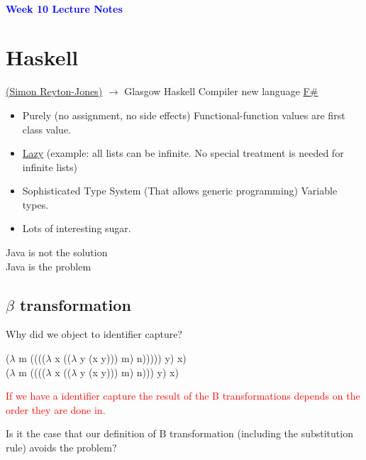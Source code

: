 \documentclass{article}
\begin{document}
\begin{flushleft}
\noindent\makebox[\linewidth]{\rule{\paperwidth}{0.4pt}}\\
\vspace*{1.5cm}
\textcolor{blue}{\textbf{{\huge Week 10 Lecture Notes}}}
\section*{Haskell}
\begin{flushleft}
\underline{(Simon Reyton-Jones)} $\rightarrow$ Glasgow Haskell Compiler new language \underline{F\#}
\begin{itemize}
\item Purely (no assignment, no side effects) Functional-function values are first class value.
\item \underline{Lazy} (example: all lists can be infinite. No special treatment is needed for infinite lists)
\item Sophisticated Type System (That allows generic programming) Variable types.
\item Lots of interesting sugar.
\end{itemize}
\begin{flushleft}
\begin{tcolorbox}
Java is not the solution\\
Java is the problem
\end{tcolorbox}
\bigskip
\end{flushleft}
	
\subsection*{$\beta$ transformation}
\begin{flushleft}
Why did we object to identifier capture?\\
\begin{flushleft}
\doublespacing 
($\lambda$ m (((($\lambda$ x (($\lambda$ y (x y))) m) n))))) y) x)\\ ($\lambda$ m (((($\lambda$ x (($\lambda$ y (x y))) m) n))) y) x)
\end{flushleft}
\textcolor{red}{If we have a identifier capture the result of the B transformations depends on the order they are done in.}
\end{flushleft}
\begin{flushleft}
Is it the case that our definition of B transformation (including the substitution rule) avoids the problem?\\
\bigskip
\end{flushleft}


\end{flushleft}
\end{flushleft}
\end{document}
